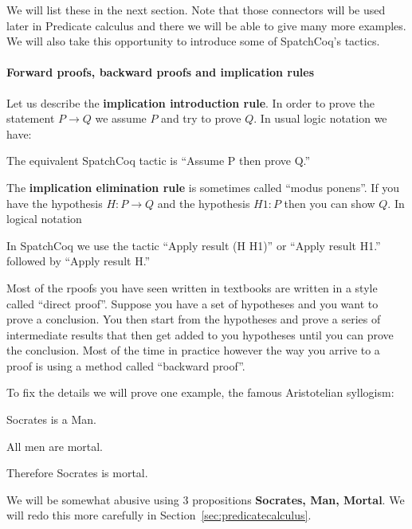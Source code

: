 \begin{itemize}
 
 

 We will list these in the next section. Note that those connectors will be used later in Predicate calculus and there we will be able to give many more examples. We will also take this opportunity to introduce some of SpatchCoq's tactics.

\paragraph{\bf Forward proofs, backward proofs and implication rules}

Let us describe the {\bf implication introduction rule}.  In order to prove the statement $P\rightarrow Q$ we  assume $P$ and try to prove $Q$. In usual logic notation we have:


The equivalent SpatchCoq tactic is ``Assume P then prove Q.''


The {\bf implication elimination rule} is sometimes called ``modus ponens''. If you have the hypothesis $H:P\rightarrow Q$ and the hypothesis $H1:P$ then you can show $Q$. In logical notation


In SpatchCoq we use the tactic ``Apply result (H H1)'' or ``Apply result H1.'' followed by ``Apply result H.''



Most of the rpoofs you have seen written in textbooks are written in a style called ``direct proof''. Suppose you have a set of hypotheses and you want to prove a conclusion. You then start from the hypotheses and prove a series of intermediate results that then get added to you hypotheses until you can prove the conclusion. Most of the time in practice however the way you arrive to a proof is using a method called ``backward proof''. 

To fix the details we will prove one example, the famous Aristotelian syllogism:

Socrates is a Man.

All men are mortal.

Therefore Socrates is mortal.

We will be somewhat abusive using 3 propositions {\bf Socrates, Man, Mortal}. We will redo this more carefully in Section~\ref{sec:predicatecalculus}.


\end{itemize}
